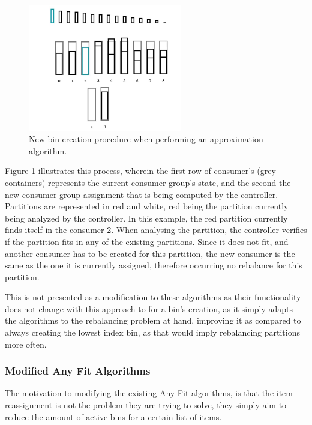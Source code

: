\begin{figure}[H] \centering
\includegraphics[width=0.6\textwidth]{images/controller/ApproximationAlgorithm_NewBin.png}
\caption{New bin creation procedure when performing an approximation algorithm.}
\label{fig:approximation_bin_creation} \end{figure}

Figure \ref{fig:approximation_bin_creation} illustrates this process, wherein
the first row of consumer's (grey containers) represents the current consumer
group's state, and the second the new consumer group assignment that is being
computed by the controller. Partitions are represented in red and white, red
being the partition currently being analyzed by the controller. In this example,
the red partition currently finds itself in the consumer 2. When analysing the
partition, the controller verifies if the partition fits in any of the existing
partitions. Since it does not fit, and another consumer has to be created for
this partition, the new consumer is the same as the one it is currently
assigned, therefore occurring no rebalance for this partition.

This is not presented as a modification to these algorithms as their
functionality does not change with this approach to for a bin's creation, as it
simply adapts the algorithms to the rebalancing problem at hand, improving it as
compared to always creating the lowest index bin, as that would imply
rebalancing partitions more often.

\subsubsection{Modified Any Fit Algorithms}
\label{subsub:modified_any_fit}

The motivation to modifying the existing Any Fit algorithms, is that the item
reassignment is not the problem they are trying to solve, they simply aim to
reduce the amount of active bins for a certain list of items. 

